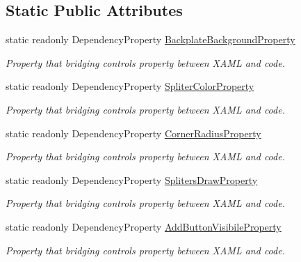 \subsection*{Static Public Attributes}
\begin{DoxyCompactItemize}
\item 
static readonly Dependency\+Property \mbox{\hyperlink{class_wpf_handler_1_1_u_i_1_1_controls_1_1_auto_collection_ad8966a126d82307e2796bba38737518e}{Backplate\+Background\+Property}}
\begin{DoxyCompactList}\small\item\em Property that bridging control\textquotesingle{}s property between X\+A\+ML and code. \end{DoxyCompactList}\item 
static readonly Dependency\+Property \mbox{\hyperlink{class_wpf_handler_1_1_u_i_1_1_controls_1_1_auto_collection_a0d827839ba40e106ecbe9470a7e4c53b}{Spliter\+Color\+Property}}
\begin{DoxyCompactList}\small\item\em Property that bridging control\textquotesingle{}s property between X\+A\+ML and code. \end{DoxyCompactList}\item 
static readonly Dependency\+Property \mbox{\hyperlink{class_wpf_handler_1_1_u_i_1_1_controls_1_1_auto_collection_a7f269c1eaefddc9f23e9aa7c523740de}{Corner\+Radius\+Property}}
\begin{DoxyCompactList}\small\item\em Property that bridging control\textquotesingle{}s property between X\+A\+ML and code. \end{DoxyCompactList}\item 
static readonly Dependency\+Property \mbox{\hyperlink{class_wpf_handler_1_1_u_i_1_1_controls_1_1_auto_collection_a142911c55327f71205f61bf4f32f2e35}{Spliters\+Draw\+Property}}
\begin{DoxyCompactList}\small\item\em Property that bridging control\textquotesingle{}s property between X\+A\+ML and code. \end{DoxyCompactList}\item 
static readonly Dependency\+Property \mbox{\hyperlink{class_wpf_handler_1_1_u_i_1_1_controls_1_1_auto_collection_aff46124c0cd77747b466fa231ce4f264}{Add\+Button\+Visibile\+Property}}
\begin{DoxyCompactList}\small\item\em Property that bridging control\textquotesingle{}s property between X\+A\+ML and code. \end{DoxyCompactList}\item 

\end{DoxyCompactItemize}
